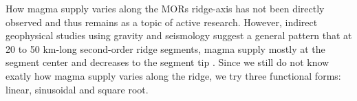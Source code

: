 How magma supply varies along the MORs ridge-axis has not been directly observed and thus remains as a topic of active research. However, indirect geophysical studies using gravity and seismology suggest a general pattern that at 20 to 50 km-long second-order ridge segments, magma supply mostly at the segment center and decreases to the segment tip \citep{Carbotte2015}. Since we still do not know exatly how magma supply varies along the ridge, we try three functional forms: linear, sinusoidal and square root.


